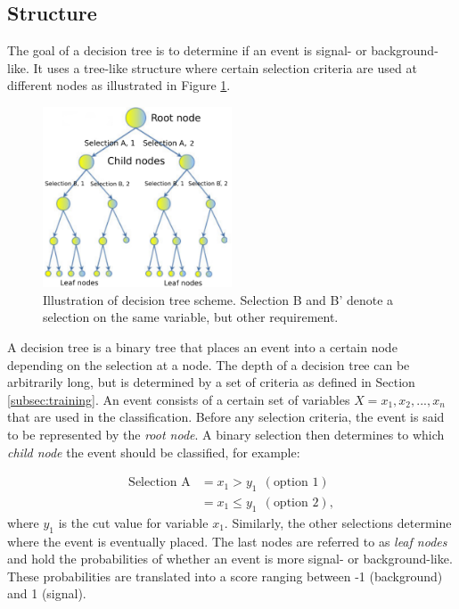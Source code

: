 \subsection{Structure}
The goal of a decision tree is to determine if an event is signal- or background-like. It uses a tree-like structure where certain selection criteria are used at different nodes as illustrated in Figure \ref{fig:bdt}.

\begin{figure}[t]
\centering
\includegraphics[width=0.5\textwidth]{chapter7/img/bdt.png}
\caption{Illustration of decision tree scheme. Selection B and B' denote a selection on the same variable, but other requirement.}
\label{fig:bdt}
\end{figure}
A decision tree is a binary tree that places an event into a certain node depending on the selection at a node. The depth of a decision tree can be arbitrarily long, but is determined by a set of criteria as defined in Section \ref{subsec:training}. An event consists of a certain set of variables $X = {x_1,x_2,...,x_n}$ that are used in the classification. Before any selection criteria, the event is said to be represented by the \textit{root node}. A binary selection then determines to which \textit{child node} the event should be classified, for example: 

\begin{equation}
\begin{split}
\textrm{Selection A} &= x_1 > y_1 \ \ (\textrm{option 1})\\
&= x_1 \leq y_1 \ \ (\textrm{option 2}),
\end{split}
\end{equation}
where $y_1$ is the cut value for variable $x_1$. Similarly, the other selections determine where the event is eventually placed. The last nodes are referred to as \textit{leaf nodes} and hold the probabilities of whether an event is more signal- or background-like. These probabilities are translated into a score ranging between -1 (background) and 1 (signal). 

